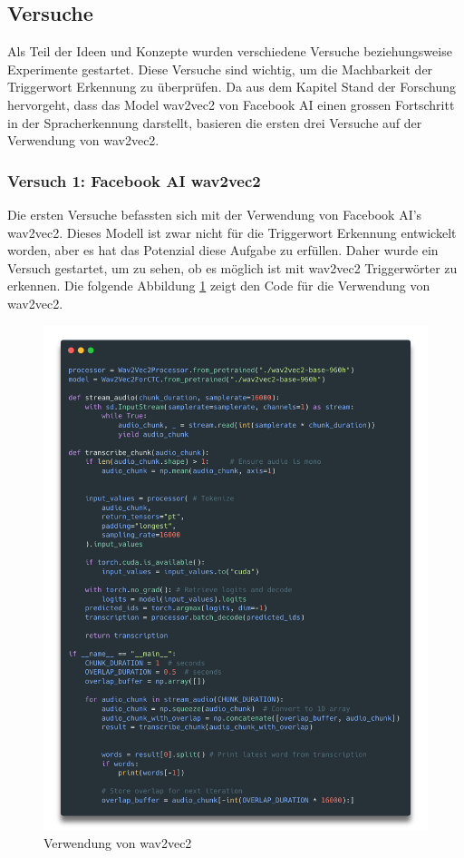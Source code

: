\documentclass[11pt,a4paper]{article}
\begin{document}
\subsection{Versuche}
Als Teil der Ideen und Konzepte wurden verschiedene Versuche beziehungsweise Experimente gestartet. 
Diese Versuche sind wichtig, um die Machbarkeit der Triggerwort Erkennung zu überprüfen. Da aus dem 
Kapitel Stand der Forschung hervorgeht, dass das Model wav2vec2 von Facebook AI einen grossen 
Fortschritt in der Spracherkennung darstellt, basieren die ersten drei Versuche auf der Verwendung 
von wav2vec2.


\subsubsection{Versuch 1: Facebook AI wav2vec2}
Die ersten Versuche befassten sich mit der Verwendung von Facebook AI's wav2vec2. Dieses Modell 
ist zwar nicht für die Triggerwort Erkennung entwickelt worden, aber es hat das Potenzial diese 
Aufgabe zu erfüllen. Daher wurde ein Versuch gestartet, um zu sehen, ob es möglich ist mit wav2vec2 
Triggerwörter zu erkennen. Die folgende Abbildung \ref{fig:wav2vec2_code} zeigt den Code 
für die Verwendung von wav2vec2. 

\begin{figure}[h]
	\centering
	\includegraphics[width=0.75\linewidth]{img/wav2vec2_code.png}
	\caption{Verwendung von wav2vec2}
	\label{fig:wav2vec2_code}
\end{figure}
\end{document}
